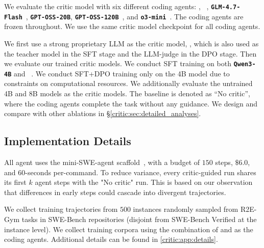We evaluate the critic model with six different coding agents: \textbf{\criticqwenThirtyTwoB{}}, \textbf{\criticqwenNextEightyB{}}~\citep{qwen3}, 
\textbf{\texttt{GLM-4.7-Flash}}~\citep{glm47flash}, \textbf{\texttt{GPT-OSS-20B}},
\textbf{\texttt{GPT-OSS-120B}}~\citep{openai2025gptoss}, and \textbf{\texttt{o3-mini}}~\citep{openai2025o3mini}. 
The coding agents are frozen throughout. 
We use the same critic model checkpoint for all coding agents.

 We first use a strong proprietary LLM as the critic model, \textbf{\criticopus{}} \citep{claude46}, which is also used as the teacher model in the SFT stage and the LLM-judge in the DPO stage.
Then we evaluate our trained critic models. 
We conduct SFT training on both \textbf{\texttt{Qwen3-4B}} and \textbf{\criticqwenEightB{}}~\citep{qwen3}. We conduct SFT+DPO training only on the 4B model due to constraints on computational resources.
We additionally evaluate the untrained 4B and 8B models as the critic models.
The baseline is denoted as ``No critic'', where the coding agents complete the task without any guidance.
We design and compare with other ablations in \S\ref{critic:sec:detailed_analyses}.


\subsection{Implementation Details}
\label{critic:sec:details}
All agent uses the mini-SWE-agent scaffold~\cite{swe-agent}, with a budget of $150$ steps, $\$6.0$, and $60$-seconds per-command.
To reduce variance, every critic-guided run shares its first $k$ agent steps with the "No critic" run. 
This is based on our observation that differences in early steps could cascade into divergent trajectories.

We collect training trajectories from $500$ instances randomly sampled from R2E-Gym tasks in SWE-Bench repositories (disjoint from SWE-Bench Verified at the instance level).
We collect training corpora using the combination of \criticcwm{} and \criticqwenNext{} as the coding agents.
Additional details can be found in \autoref{critic:app:details}.

\newcommand{\criticuparr}[1]{\,\textcolor{darkgreen}{\scriptsize($\uparrow$#1)}}
\newcommand{\criticdownarr}[1]{\,\textcolor{red}{\scriptsize($\downarrow$#1)}}

